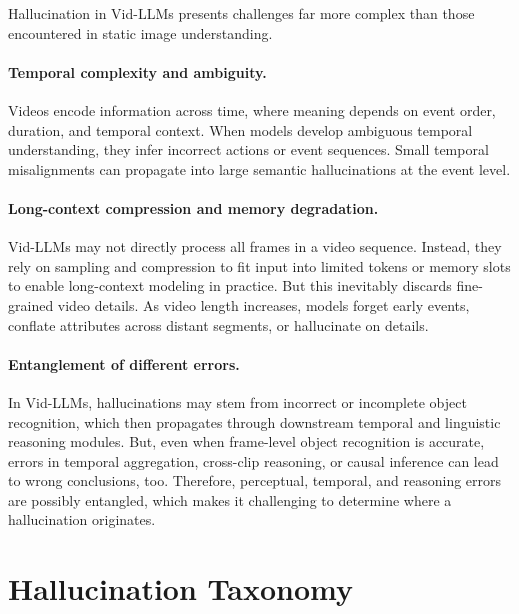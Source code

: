 \documentclass[10pt]{article} %
\begin{document}
Hallucination in Vid-LLMs presents challenges far more complex than those encountered in static image understanding. %

\paragraph{Temporal complexity and ambiguity.}
Videos encode information across time, where meaning depends on event order, duration, and temporal context. When models develop ambiguous temporal understanding, they infer incorrect actions or event sequences. Small temporal misalignments can propagate into large semantic hallucinations at the event level.

\paragraph{Long-context compression and memory degradation.}
Vid-LLMs may not directly process all frames in a video sequence. Instead, they rely on sampling and compression to fit input into limited tokens or memory slots to enable long-context modeling in practice. But this inevitably discards fine-grained video details. As video length increases, models forget early events, conflate attributes across distant segments, or hallucinate on details.

\paragraph{Entanglement of different errors.}
In Vid-LLMs, hallucinations may stem from incorrect or incomplete object recognition, which then propagates through downstream temporal and linguistic reasoning modules. But, even when frame-level object recognition is accurate, errors in temporal aggregation, cross-clip reasoning, or causal inference can lead to wrong conclusions, too. Therefore, perceptual, temporal, and reasoning errors are possibly entangled, which makes it challenging to determine where a hallucination originates.

\section{Hallucination Taxonomy}\label{sec:hallucination-tax}
\end{document}
